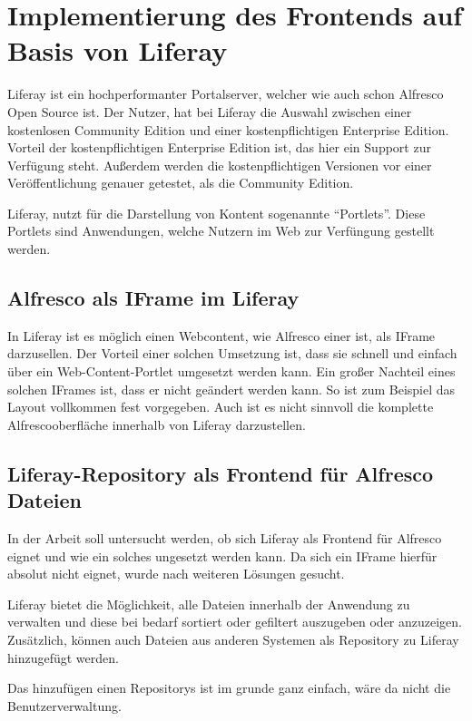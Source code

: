 \section{Implementierung des Frontends auf Basis von Liferay} \label{Implementierung Frontend}
Liferay ist ein hochperformanter Portalserver, welcher wie auch schon Alfresco Open Source ist. Der Nutzer, hat bei Liferay die Auswahl zwischen einer kostenlosen Community Edition und einer kostenpflichtigen Enterprise Edition. Vorteil der kostenpflichtigen Enterprise Edition ist, das hier ein Support zur Verf\"ugung steht. Au\ss{}erdem werden die kostenpflichtigen Versionen vor einer Ver\"offentlichung genauer getestet, als die Community Edition.
\cite{Alfresco_und_Liferay} \cite{Wiki_Liferay}

Liferay, nutzt f\"ur die Darstellung von Kontent sogenannte "`Portlets"'. Diese Portlets sind Anwendungen, welche Nutzern im Web zur Verf\"ungung gestellt werden.

\subsection{Alfresco als IFrame im Liferay}
In Liferay ist es m\"oglich einen Webcontent, wie Alfresco einer ist, als IFrame darzusellen. Der Vorteil einer solchen Umsetzung ist, dass sie schnell und einfach \"uber ein Web-Content-Portlet umgesetzt werden kann. Ein gro\ss{}er Nachteil eines solchen IFrames ist, dass er nicht ge\"andert werden kann. So ist zum Beispiel das Layout vollkommen fest vorgegeben. Auch ist es nicht sinnvoll die komplette Alfrescooberfl\"ache innerhalb von Liferay darzustellen.

\subsection{Liferay-Repository als Frontend f\"ur Alfresco Dateien}
In der Arbeit soll untersucht werden, ob sich Liferay als Frontend f\"ur Alfresco eignet und wie ein solches ungesetzt werden kann. Da sich ein IFrame hierf\"ur absolut nicht eignet, wurde nach weiteren L\"osungen gesucht.

Liferay bietet die M\"oglichkeit, alle Dateien innerhalb der Anwendung zu verwalten und diese bei bedarf sortiert oder gefiltert auszugeben oder anzuzeigen. Zus\"atzlich, k\"onnen auch Dateien aus anderen Systemen als Repository zu Liferay hinzugef\"ugt werden. 

Das hinzuf\"ugen einen Repositorys ist im grunde ganz einfach, w\"are da nicht die Benutzerverwaltung.

